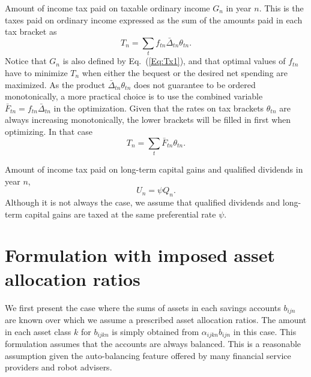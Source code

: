\documentclass{report}[fleqn,11pt]
\begin{document}
\begin{description}[leftmargin=4em,style=multiline]
\item [$T_n$]
	Amount of income tax paid on taxable ordinary income $G_n$ in year $n$.
	This is the taxes paid on ordinary income expressed as the sum of the amounts
	paid in each tax bracket as
	\begin{equation}
		\label{Eq:IncTax0}
		T_n = \sum_t f_{tn}\bar{\Delta}_{tn}\theta_{tn}.
	\end{equation}
	Notice that $G_n$ is also defined by Eq.~(\ref{Eq:Tx1}), and that optimal
	values of $f_{tn}$ have to
	minimize $T_n$ when either the bequest or the desired net spending are maximized.
	As the product $\bar{\Delta}_{tn}\theta_{tn}$ does not guarantee to
	be ordered monotonically, a more practical choice is to use the combined variable
	$\bar{F}_{tn} = f_{tn}\bar{\Delta}_{tn}$ in the optimization. Given that the rates on
	tax brackets $\theta_{tn}$ are always increasing monotonically, the lower brackets
	will be filled in first when optimizing. In that case
	\begin{equation}
		\label{Eq:IncTax1}
		T_n = \sum_t \bar{F}_{tn} \theta_{tn}.
	\end{equation}

\item [$U_n$]
	Amount of income tax paid on long-term capital gains and qualified dividends in year $n$,
	\begin{equation}
		U_n = \psi Q_n.
	\end{equation}
	Although it is not always the case, we assume that qualified dividends and long-term
	capital gains are taxed at the same preferential rate $\psi$.

\end{description}

\chapter{Formulation with imposed asset allocation ratios}
We first present the case where the sums of assets in each savings accounts $b_{ijn}$ are known
over which we assume a prescribed asset allocation ratios.
The amount in each asset class $k$ for $b_{ijkn}$ is simply obtained
from $\alpha_{ijkn} b_{ijn}$ in this case.
This formulation assumes that the accounts are always balanced. This is
a reasonable assumption given the auto-balancing feature offered by many financial service
providers and robot advisers.
\end{document}
